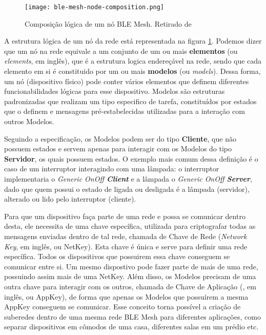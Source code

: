 \documentclass[../monografia.tex]{subfiles}
\begin{document}
\begin{figure}[h!]
	\centering
	\texttt{[image: ble-mesh-node-composition.png]}
	\caption{Composição lógica de um nó BLE Mesh. Retirado de \cite{ble-mesh-models}}
	\label{fig:ble-mesh-node-composition}
\end{figure}

A estrutura lógica de um nó da rede está representada na figura \ref{fig:ble-mesh-node-composition}. Podemos dizer que um nó na rede equivale a um conjunto de um ou mais \textbf{elementos} (ou \textit{elements}, em inglês), que é a estrutura logica endereçável na rede, sendo que cada elemento em si é constituido por um ou mais \textbf{modelos} (ou \textit{models}). Dessa forma, um nó (dispositivo físico) pode conter vários elementos que definem diferentes funcionabilidades lógicas para esse dispositivo. Modelos são estruturas padronizadas que realizam um tipo especifico de tarefa, constituídos por estados que o definem e mensagens pré-estabelecidas utilizadas para a interação com outros Modelos.

Seguindo a especificação, os Modelos podem ser do tipo \textbf{Cliente}, que não possuem estados e servem apenas para interagir com os Modelos do tipo \textbf{Servidor}, os quais possuem estados. O exemplo mais comum dessa definição é o caso de um interruptor interagindo com uma lâmpada: o interruptor implementaria o \textit{Generic OnOff \textbf{Client}} e a lâmpada o \textit{Generic OnOff \textbf{Server}}, dado que quem possui o estado de ligada ou desligada é a lâmpada (servidor), alterado ou lido pelo interruptor (cliente).

Para que um dispositivo faça parte de uma rede e possa se comunicar dentro desta, ele necessita de uma chave específica, utilizada para criptografar todas as mensagens enviadas dentro de tal rede, chamada de Chave de Rede (\textit{Network Key}, em inglês, ou NetKey). Esta chave é única e serve para definir uma rede específica. Todos os dispositivos que possuirem essa chave conseguem se comunicar entre si. Um mesmo dispostivo pode fazer parte de mais de uma rede, possuindo assim mais de uma NetKey. Além disso, os Modelos precisam de uma outra chave para interagir com os outros, chamada de Chave de Aplicação (, em inglês, ou AppKey), de forma que apenas os Modelos que possuírem a mesma AppKey conseguem se comunicar. Esse conceito torna possível a criação de suberedes dentro de uma mesma rede BLE Mesh para diferentes aplicações, como separar dispositivos em cômodos de uma casa, diferentes salas em um prédio etc.
\end{document}
